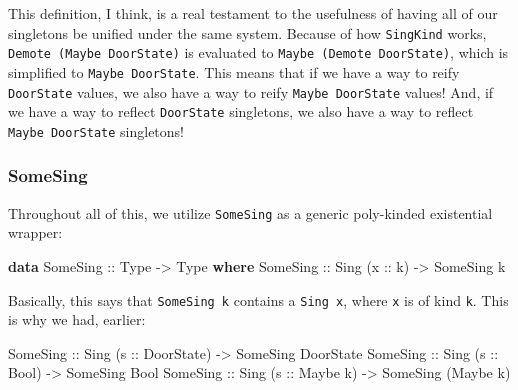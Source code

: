 \documentclass[]{article}
\newenvironment{Shaded}{}{}
\newcommand{\DataTypeTok}[1]{\textcolor[rgb]{0.56,0.13,0.00}{#1}}
\newcommand{\KeywordTok}[1]{\textcolor[rgb]{0.00,0.44,0.13}{\textbf{#1}}}
\newcommand{\NormalTok}[1]{#1}
\newcommand{\OtherTok}[1]{\textcolor[rgb]{0.00,0.44,0.13}{#1}}
\begin{document}
This definition, I think, is a real testament to the usefulness of having all of
our singletons be unified under the same system. Because of how
\texttt{SingKind} works, \texttt{Demote\ (Maybe\ DoorState)} is evaluated to
\texttt{Maybe\ (Demote\ DoorState)}, which is simplified to
\texttt{Maybe\ DoorState}. This means that if we have a way to reify
\texttt{DoorState} values, we also have a way to reify \texttt{Maybe\ DoorState}
values! And, if we have a way to reflect \texttt{DoorState} singletons, we also
have a way to reflect \texttt{Maybe\ DoorState} singletons!

\hypertarget{somesing}{%
\subsubsection{SomeSing}\label{somesing}}

Throughout all of this, we utilize \texttt{SomeSing} as a generic poly-kinded
existential wrapper:

\begin{Shaded}
\begin{Highlighting}[]
\KeywordTok{data} \DataTypeTok{SomeSing}\OtherTok{ ::} \DataTypeTok{Type} \OtherTok{{-}>} \DataTypeTok{Type} \KeywordTok{where}
    \DataTypeTok{SomeSing}\OtherTok{ ::} \DataTypeTok{Sing}\NormalTok{ (}\OtherTok{x ::}\NormalTok{ k) }\OtherTok{{-}>} \DataTypeTok{SomeSing}\NormalTok{ k}
\end{Highlighting}
\end{Shaded}

Basically, this says that \texttt{SomeSing\ k} contains a \texttt{Sing\ x},
where \texttt{x} is of kind \texttt{k}. This is why we had, earlier:

\begin{Shaded}
\begin{Highlighting}[]
\DataTypeTok{SomeSing}\OtherTok{ ::} \DataTypeTok{Sing}\NormalTok{ (}\OtherTok{s ::} \DataTypeTok{DoorState}\NormalTok{) }\OtherTok{{-}>} \DataTypeTok{SomeSing} \DataTypeTok{DoorState}
\DataTypeTok{SomeSing}\OtherTok{ ::} \DataTypeTok{Sing}\NormalTok{ (}\OtherTok{s ::} \DataTypeTok{Bool}\NormalTok{)      }\OtherTok{{-}>} \DataTypeTok{SomeSing} \DataTypeTok{Bool}
\DataTypeTok{SomeSing}\OtherTok{ ::} \DataTypeTok{Sing}\NormalTok{ (}\OtherTok{s ::} \DataTypeTok{Maybe}\NormalTok{ k)   }\OtherTok{{-}>} \DataTypeTok{SomeSing}\NormalTok{ (}\DataTypeTok{Maybe}\NormalTok{ k)}
\end{Highlighting}
\end{Shaded}
\end{document}
